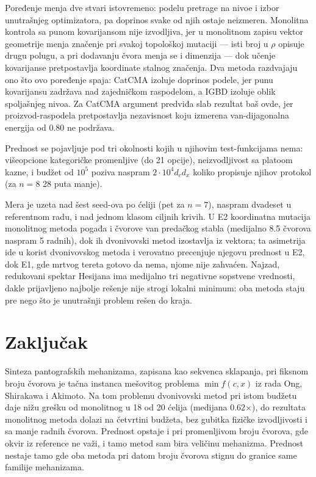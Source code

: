 \documentclass[
  conference,
  a4paper,
  10pt]{IEEEtran}
\begin{document}
Poređenje menja dve stvari istovremeno: podelu pretrage na nivoe i izbor
unutrašnjeg optimizatora, pa doprinos svake od njih ostaje neizmeren.
Monolitna kontrola sa punom kovarijansom nije izvodljiva, jer u
monolitnom zapisu vektor geometrije menja značenje pri svakoj topološkoj
mutaciji --- isti broj u \(\rho\) opisuje drugu polugu, a pri dodavanju
čvora menja se i dimenzija --- dok učenje kovarijanse pretpostavlja
koordinate stalnog značenja. Dva metoda razdvajaju ono što ovo poređenje
spaja: CatCMA izoluje doprinos podele, jer punu kovarijansu zadržava nad
zajedničkom raspodelom, a IGBD izoluje oblik spoljašnjeg nivoa. Za
CatCMA argument predviđa slab rezultat baš ovde, jer proizvod-raspodela
pretpostavlja nezavisnost koju izmerena van-dijagonalna energija od 0.80
ne podržava.

Prednost se pojavljuje pod tri okolnosti kojih u njihovim
test-funkcijama nema: višeopcione kategoričke promenljive (do 21
opcije), neizvodljivost sa platoom kazne, i budžet od \(10^5\) poziva
naspram \(2\cdot10^4 d_c d_x\) koliko propisuje njihov protokol (za
\(n=8\) 28 puta manje).

Mera je uzeta nad šest seed-ova po ćeliji (pet za \(n=7\)), naspram
dvadeset u referentnom radu, i nad jednom klasom ciljnih krivih. U E2
koordinatna mutacija monolitnog metoda pogađa i čvorove van predačkog
stabla (medijalno 8.5 čvorova naspram 5 radnih), dok ih dvonivovski
metod izostavlja iz vektora; ta asimetrija ide u korist dvonivovskog
metoda i verovatno precenjuje njegovu prednost u E2, dok E1, gde mrtvog
tereta gotovo da nema, njome nije zahvaćen. Najzad, redukovani spektar
Hesijana ima medijalno tri negativne sopstvene vrednosti, dakle
prijavljeno najbolje rešenje nije strogi lokalni minimum: oba metoda
staju pre nego što je unutrašnji problem rešen do kraja.

\hypertarget{zakljuux10dak}{%
\section{Zaključak}\label{zakljuux10dak}}

Sinteza pantografskih mehanizama, zapisana kao sekvenca sklapanja, pri
fiksnom broju čvorova je tačna instanca mešovitog problema
\(\min f(c,x)\) iz rada Ong, Shirakawa i Akimoto. Na tom problemu
dvonivovski metod pri istom budžetu daje nižu grešku od monolitnog u 18
od 20 ćelija (medijana 0.62×), do rezultata monolitnog metoda dolazi na
četvrtini budžeta, bez gubitka fizičke izvodljivosti i sa manje radnih
čvorova. Prednost opstaje i pri promenljivom broju čvorova, gde okvir iz
reference ne važi, i tamo metod sam bira veličinu mehanizma. Prednost
nestaje tamo gde oba metoda pri datom broju čvorova stignu do granice
same familije mehanizama.
\end{document}
